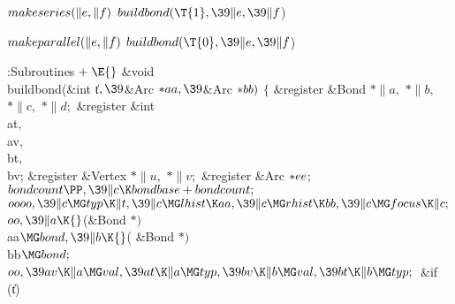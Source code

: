 \Y\B\4\D$\\{makeseries}(\|e,\|f)$ \5
$\\{buildbond}(\T{1},\39\|e,\39\|f{}$)\par
\B\4\D$\\{makeparallel}(\|e,\|f)$ \5
$\\{buildbond}(\T{0},\39\|e,\39\|f{}$)\par
\Y\B\4:Subroutines\X${}\mathrel+\E{}$\6
\&{void} \\{buildbond}(\&{int} \|t${},\39{}$\&{Arc} ${}{*}\\{aa},\39{}$\&{Arc}
${}{*}\\{bb}){}$\1\1\2\2\6
${}\{{}$\1\6
\&{register} \&{Bond} ${}{*}\|a,{}$ ${}{*}\|b,{}$ ${}{*}\|c,{}$ ${}{*}\|d;{}$\6
\&{register} \&{int} \\{at}${},{}$ \\{av}${},{}$ \\{bt}${},{}$ \\{bv};\6
\&{register} \&{Vertex} ${}{*}\|u,{}$ ${}{*}\|v;{}$\6
\&{register} \&{Arc} ${}{*}\\{ee}{}$;\7
${}\\{bondcount}\PP,\39\|c\K\\{bondbase}+\\{bondcount};{}$\6
${}\\{oooo},\39\|c\MG\\{typ}\K\|t,\39\|c\MG\\{lhist}\K\\{aa},\39\|c\MG\\{rhist}%
\K\\{bb},\39\|c\MG\\{focus}\K\|c;{}$\6
${}\\{oo},\39\|a\K{}$(\&{Bond} ${}{*}){}$ \\{aa}${}\MG\\{bond},\39\|b\K{}$(%
\&{Bond} ${}{*}){}$ \\{bb}${}\MG\\{bond};{}$\6
${}\\{oo},\39\\{av}\K\|a\MG\\{val},\39\\{at}\K\|a\MG\\{typ},\39\\{bv}\K\|b\MG%
\\{val},\39\\{bt}\K\|b\MG\\{typ};{}$\6
\&{if} (\|t)\1\5
